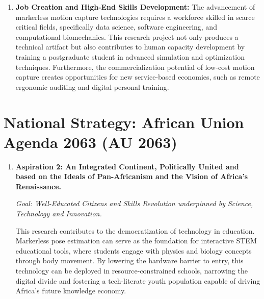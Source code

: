 \begin{enumerate}
    \item \textbf{Job Creation and High-End Skills Development:}
    The advancement of markerless motion capture technologies requires a workforce skilled in scarce critical fields, specifically data science, software engineering, and computational biomechanics. This research project not only produces a technical artifact but also contributes to human capacity development by training a postgraduate student in advanced simulation and optimization techniques. Furthermore, the commercialization potential of low-cost motion capture creates opportunities for new service-based economies, such as remote ergonomic auditing and digital personal training.
\end{enumerate}

\section{National Strategy: African Union Agenda 2063 (AU 2063)}
\label{sec:au2063}

\begin{enumerate}

    \item \textbf{Aspiration 2: An Integrated Continent, Politically United and based on the Ideals of Pan-Africanism and the Vision of Africa’s Renaissance.}
    
    \textit{Goal: Well-Educated Citizens and Skills Revolution underpinned by Science, Technology and Innovation.}
    
    This research contributes to the democratization of technology in education. Markerless pose estimation can serve as the foundation for interactive STEM educational tools, where students engage with physics and biology concepts through body movement. By lowering the hardware barrier to entry, this technology can be deployed in resource-constrained schools, narrowing the digital divide and fostering a tech-literate youth population capable of driving Africa’s future knowledge economy.
\end{enumerate}

\label{sec:sdgs}


